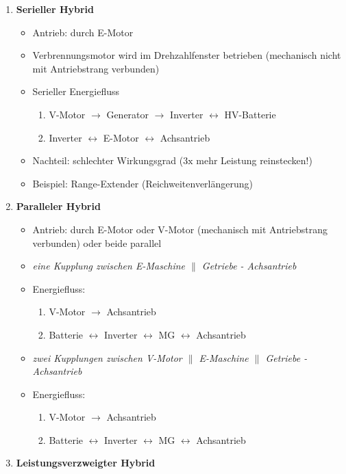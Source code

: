 \begin{enumerate}
\item
  \textbf{Serieller Hybrid}

  \begin{itemize}
  \item
    Antrieb: durch E-Motor
  \item
    Verbrennungsmotor wird im Drehzahlfenster betrieben (mechanisch
    nicht mit Antriebstrang verbunden)
  \item
    Serieller Energiefluss

    \begin{enumerate}
    \def\labelenumii{\arabic{enumii}.}
    \item
      V-Motor $\to$ Generator $\to$ Inverter $\leftrightarrow$
      HV-Batterie
    \item
      Inverter $\leftrightarrow$ E-Motor $\leftrightarrow$
      Achsantrieb
    \end{enumerate}
  \item
    Nachteil: schlechter Wirkungsgrad ($3\text{x}$ mehr Leistung
    reinstecken!)
  \item
    Beispiel: Range-Extender (Reichweitenverlängerung)
  \end{itemize}
\item
  \textbf{Paralleler Hybrid}

  \begin{itemize}
  \item
    Antrieb: durch E-Motor oder V-Motor (mechanisch mit Antriebstrang
    verbunden) oder beide parallel
  \item
    \emph{eine Kupplung zwischen E-Maschine $\parallel$ Getriebe -
    Achsantrieb}
  \item
    Energiefluss:

    \begin{enumerate}
    \def\labelenumii{\arabic{enumii}.}
    \item
      V-Motor $\to$ Achsantrieb
    \item
      Batterie $\leftrightarrow$ Inverter $\leftrightarrow$ MG
      $\leftrightarrow$ Achsantrieb
    \end{enumerate}
  \item
    \emph{zwei Kupplungen zwischen V-Motor $\parallel$ E-Maschine
    $\parallel$ Getriebe - Achsantrieb}
  \item
    Energiefluss:

    \begin{enumerate}
    \def\labelenumii{\arabic{enumii}.}
    \item
      V-Motor $\to$ Achsantrieb
    \item
      Batterie $\leftrightarrow$ Inverter $\leftrightarrow$ MG
      $\leftrightarrow$ Achsantrieb
    \end{enumerate}
  \end{itemize}
\item
  \textbf{Leistungsverzweigter Hybrid}


\end{enumerate}
